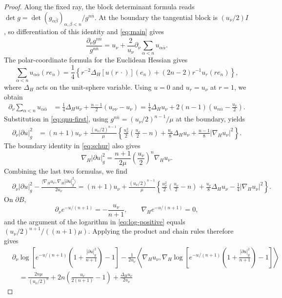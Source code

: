 \documentclass[11pt]{article}
\begin{document}
\begin{proof}
Along the fixed ray, the block determinant formula reads
$\det g=\det(g_{\alpha\bar\beta})_{\alpha,\beta<n}/g^{n\bar n}$.
At the boundary the tangential block is $(u_\nu/2)I$, so
differentiation of this identity and \eqref{eq:main} gives
$$
 \frac{\partial_\nu g^{n\bar n}}{g^{n\bar n}}
 =u_\nu+\frac2{u_\nu}
       \partial_\nu\sum_{\alpha<n}u_{\alpha\bar\alpha}.
$$
The polar-coordinate formula for the Euclidean Hessian gives
$$
 \sum_{\alpha<n}u_{\alpha\bar\alpha}(re_n)
 =\frac14\left\{
 r^{-2}\Delta_H[u(r\,\cdot)](e_n)+(2n-2)r^{-1}u_r(re_n)
 \right\},
$$
where $\Delta_H$ acts on the unit-sphere variable.
Using $u=0$ and $u_r=u_\nu$ at $r=1$, we obtain
\begin{align*}
 \partial_\nu\sum_{\alpha<n}u_{\alpha\bar\alpha}
 &=\frac14\Delta_Hu_\nu
   +\frac{n-1}{2}(u_{\nu\nu}-u_\nu)
 =\frac14\Delta_Hu_\nu
   +2(n-1)\left(u_{n\bar n}-\frac{u_\nu}{2}\right).
\end{align*}
Substitution in \eqref{eq:qnu-first}, using
$g^{n\bar n}=(u_\nu/2)^{n-1}/\mu$ at the boundary, yields
\begin{align*}
 \partial_\nu|\partial u|_g^2
 &=(n+1)u_\nu+\frac{(u_\nu/2)^{n-1}}{\mu}
 \left\{\frac{u_\nu^2}{2}\left(\frac{u_\nu}{2}-n\right)
 +\frac{u_\nu}{8}\Delta_Hu_\nu
 +\frac{n-1}{8}|\nabla_Hu_\nu|^2\right\}.
\end{align*}
The boundary identity in \eqref{eq:schur} also gives
$$
 \nabla_H|\partial u|_g^2
 =\frac{n+1}{2\mu}\left(\frac{u_\nu}{2}\right)^n\nabla_Hu_\nu.
$$
Combining the last two formulas, we find
\begin{align*}
 &\partial_\nu|\partial u|_g^2-
 \frac{\langle\nabla_Hu_\nu,\nabla_H|\partial u|_g^2\rangle}{2u_\nu}=(n+1)u_\nu+\frac{(u_\nu/2)^{n-1}}{\mu}
 \left\{\frac{u_\nu^2}{2}\left(\frac{u_\nu}{2}-n\right)
 +\frac{u_\nu}{8}\Delta_Hu_\nu
 -\frac14|\nabla_Hu_\nu|^2\right\}.
\end{align*}
On $\partial B$,
$$
 \partial_\nu e^{-u/(n+1)}=-\frac{u_\nu}{n+1},\qquad
 \nabla_He^{-u/(n+1)}=0,
$$
and the argument of the logarithm in \eqref{eq:log-positive}
equals $(u_\nu/2)^{n+1}/((n+1)\mu)$. Applying the product and
chain rules therefore gives
\begin{align*}
 &\partial_\nu\log\left[e^{-u/(n+1)}\left(1+\frac{|\partial u|_g^2}{n+1}\right)-1\right]-\frac1{2u_\nu}
       \left\langle\nabla_Hu_\nu,\nabla_H\log\left[e^{-u/(n+1)}\left(1+\frac{|\partial u|_g^2}{n+1}\right)-1\right]\right\rangle\\
 &\quad=\frac{2n\mu}{(u_\nu/2)^n}
       +2n\left(\frac{u_\nu}{2(n+1)}-1\right)
       +\frac{\Delta_Hu_\nu}{2u_\nu}

\end{align*}
\end{proof}
\end{document}

